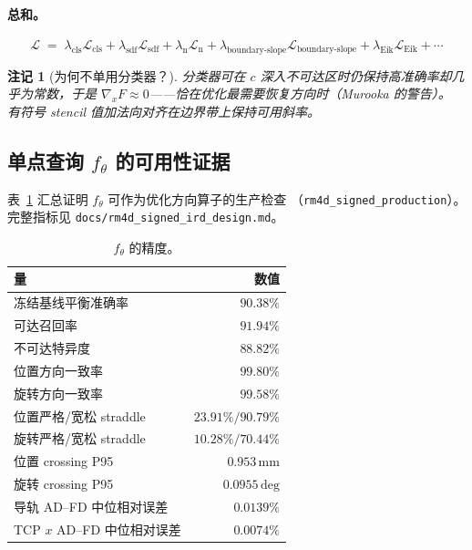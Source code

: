 \documentclass[UTF8,a4paper,11pt,fontset=fandol]{ctexart}
\newtheorem{remark}{注记}
\begin{document}
\paragraph{总和。}
\begin{equation}
\label{eq:loss-total}
  \mathcal{L}
  \;=\;
  \lambda_{\mathrm{cls}}\mathcal{L}_{\mathrm{cls}}
  +
  \lambda_{\mathrm{sdf}}\mathcal{L}_{\mathrm{sdf}}
  +
  \lambda_{\mathrm{n}}\mathcal{L}_{\mathrm{n}}
  +
  \lambda_{\mathrm{boundary\text{-}slope}}\mathcal{L}_{\mathrm{boundary\text{-}slope}}
  +
  \lambda_{\mathrm{Eik}}\mathcal{L}_{\mathrm{Eik}}
  +
  \cdots
\end{equation}

\begin{remark}[为何不单用分类器？]
分类器可在 \(c\) 深入不可达区时仍保持高准确率却几乎为常数，于是
\(\nabla_{x}F\approx 0\)——恰在优化最需要恢复方向时（Murooka 的警告）。
有符号 stencil 值加法向对齐在边界带上保持可用斜率。
\end{remark}

\subsection{\texorpdfstring{单点查询 $f_{\theta}$ 的可用性证据}{单点查询 f 的可用性证据}}
\label{sec:field-accuracy}

表~\ref{tab:f-usable} 汇总证明 \(f_{\theta}\) 可作为优化方向算子的生产检查
（\texttt{rm4d\_signed\_production}）。完整指标见
\texttt{docs/rm4d\_signed\_ird\_design.md}。

\begin{table}[ht]
\centering
\caption{\(f_{\theta}\) 的精度。}
\label{tab:f-usable}
\begin{tabular}{@{}l r@{}}
\hline\hline
量 & 数值 \\
\hline
冻结基线平衡准确率 & \(90.38\%\) \\
可达召回率 & \(91.94\%\) \\
不可达特异度 & \(88.82\%\) \\
位置方向一致率 & \(99.80\%\) \\
旋转方向一致率 & \(99.58\%\) \\
位置严格/宽松 straddle & \(23.91\% / 90.79\%\) \\
旋转严格/宽松 straddle & \(10.28\% / 70.44\%\) \\
位置 crossing P95 & \(0.953\,\mathrm{mm}\) \\
旋转 crossing P95 & \(0.0955\,\mathrm{deg}\) \\
导轨 AD--FD 中位相对误差 & \(0.0139\%\) \\
TCP \(x\) AD--FD 中位相对误差 & \(0.0074\%\) \\
\hline\hline
\end{tabular}
\end{table}
\end{document}
